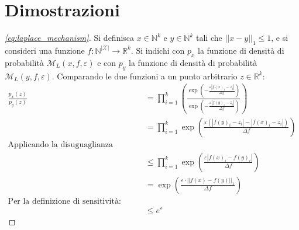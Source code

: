 \chapter{Dimostrazioni}
\begin{proof}[\ref{eq:laplace_mechanism}]
\label{proof:laplace_mechanism}
Si definisca $x \in \mathbb{N}^k$ e $y \in \mathbb{N}^k$ tali che $||x - y||_1 \le 1$, e si consideri una funzione $f \colon \mathbb{N}^{|\mathcal{X}|} \to \mathbb{R}^k$. Si indichi con $p_x$ la funzione di densità di probabilità $\mathcal{M}_L(x,f,\varepsilon)$ e con $p_y$ la funzione di densità di probabilità $\mathcal{M}_L(y,f,\varepsilon)$. Comparando le due funzioni a un punto arbitrario $z \in \mathbb{R}^k$:
\begin{align*}
    \frac{p_x(z)}{p_y(z)} &= \prod_{i = 1}^{k}\left(\frac{\exp{\left(-\frac{\varepsilon |f(x)_i - z_i|}{\Delta f}\right)}}{\exp{\left(-\frac{\varepsilon |f(y)_i - z_i|}{\Delta f}\right)}}\right)\\
    &= \prod_{i = 1}^{k}\exp{\left(\frac{\varepsilon(|f(y)_i - z_i| - |f(x)_i - z_i|)}{\Delta f}\right)}\\
    \text{Applicando la disuguaglianza triangolare:}\\
    &\le \prod_{i = 1}^{k}\exp{\left(\frac{\varepsilon|f(x)_i-f(y)_i|}{\Delta f}\right)}\\
    &= \exp{\left(\frac{\varepsilon\cdot ||f(x) - f(y)||_1}{\Delta f}\right)}\\
    \text{Per la definizione di sensitività:}\\
    &\le e^\varepsilon
\end{align*}
\end{proof}

